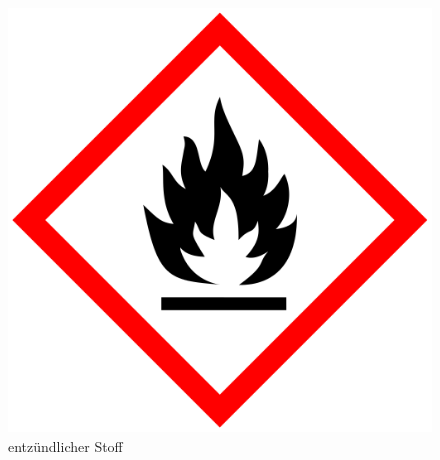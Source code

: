 \begin{figure}[h]
    \begin{center}
        \begin{minipage}[t]{0.25\textwidth}
            \begin{center}
                \includegraphics[height=0.1\textheight]{Bilder/Optische_Wellenleiter_Die_Polymer_Optische_Faser/Material_Polycarbonat/flamme.png}
                \caption[entzündlicher Stoff \newline \url{https://de.wikipedia.org/wiki/Datei:GHS-pictogram-flamme.svg} (zuletzt aufgerufen am 11.10.2015)]{entzündlicher Stoff}
                \label{fig:flamme}
            \end{center}
        \end{minipage}
        \hspace{0.025\textwidth}
        \begin{minipage}[t]{0.25\textwidth}
            \begin{center}

\end{center}
\end{minipage}
\end{center}
\end{figure}
